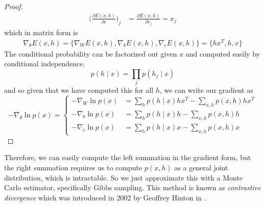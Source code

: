 \begin{proof}
\begin{align}
        \bigg( \frac{\partial E(x, h)}{\partial c} \bigg)_j & = \frac{\partial E(x, h)}{\partial c_j} = x_j 
      \end{align}  
      which in matrix form is 
      \begin{align}
        \nabla_{\theta} E(x, h) = \{ \nabla_W E(x, h), \nabla_b E(x, h), \nabla_c E(x, h) \} = \{ h x^T, h, x \}
      \end{align}
      The conditional probability can be factorized out given $x$ and computed easily by conditional independence. 
      \begin{equation}
        p(h \mid x) = \prod_j p(h_j \mid x)
      \end{equation}
      and so given that we have computed this for all $h$, we can write our gradient as 
      \begin{equation}
        -\nabla_\theta \ln{p(x)} = \begin{cases}
          - \nabla_W \ln{p(x)} & = \sum_h p(h \mid x) h x^T - \sum_{x, h} p(x, h) h x^T \\
          - \nabla_b \ln{p(x)} & =  \sum_h p(h \mid x) h - \sum_{x, h} p(x, h) h \\
          - \nabla_c \ln{p(x)} & =  \sum_h p(h \mid x) x - \sum_{x, h} p(x, h) x
        \end{cases}
      \end{equation}
    \end{proof} 

    Therefore, we can easily compute the left summation in the gradient form, but the right summation requires us to compute $p(x, h)$ as a general joint distribution, which is intractable. So we just approximate this with a Monte Carlo estimator, specifically Gibbs sampling. This method is known as \textit{contrastive divergence} which was introduced in 2002 by Geoffrey Hinton in \cite{cd}. 

